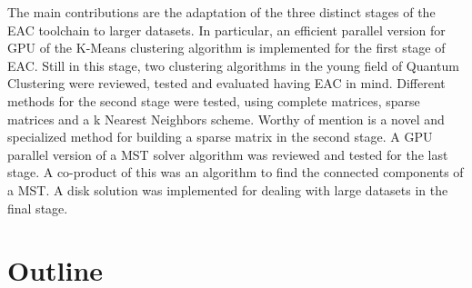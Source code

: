 The main contributions are the adaptation of the three distinct stages of the EAC toolchain to larger datasets.%
In particular, an efficient parallel version for GPU of the K-Means clustering algorithm is implemented for the first stage of EAC.
Still in this stage, two clustering algorithms in the young field of Quantum Clustering were reviewed, tested and evaluated having EAC in mind. %
Different methods for the second stage were tested, using complete matrices, sparse matrices and a k Nearest Neighbors scheme.
Worthy of mention is a novel and specialized method for building a sparse matrix in the second stage. %
A GPU parallel version of a MST solver algorithm was reviewed and tested for the last stage.
A co-product of this was an algorithm to find the connected components of a MST.
A disk solution was implemented for dealing with large datasets in the final stage.






\section{Outline}


